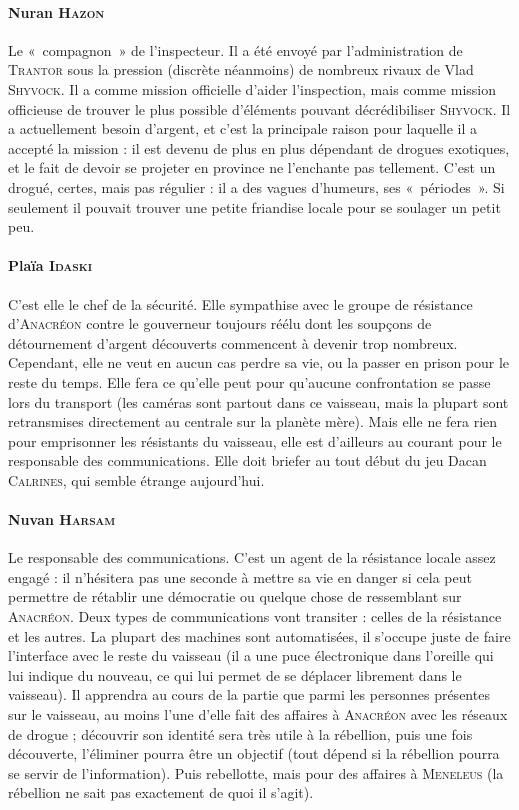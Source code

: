 \documentclass{article}
\begin{document}
{\paragraph{Nuran \textsc{Hazon}}
{
Le «~compagnon~» de l’inspecteur.
Il a été envoyé par l’administration de \textsc{Trantor} sous la pression (discrète néanmoins) de nombreux rivaux de Vlad \textsc{Shyvock}.
Il a comme mission officielle d’aider l’inspection, mais comme mission officieuse de trouver le plus possible d’éléments pouvant décrédibiliser \textsc{Shyvock}.
Il a actuellement besoin d’argent, et c’est la principale raison pour laquelle il a accepté la mission : il est devenu de plus en plus dépendant de drogues exotiques, et le fait de devoir se projeter en province ne l’enchante pas tellement. C’est un drogué, certes, mais pas régulier : il a des vagues d’humeurs, ses «~périodes~».
Si seulement il pouvait trouver une petite friandise locale pour se soulager un petit peu.
}

\paragraph{Plaïa \textsc{Idaski}}
{
C’est elle le chef de la sécurité.
Elle sympathise avec le groupe de résistance d’\textsc{Anacréon} contre le gouverneur toujours réélu dont les soupçons de détournement d’argent découverts commencent à devenir trop nombreux.
Cependant, elle ne veut en aucun cas perdre sa vie, ou la passer en prison pour le reste du temps.
Elle fera ce qu’elle peut pour qu’aucune confrontation se passe lors du transport (les caméras sont partout dans ce vaisseau, mais la plupart sont retransmises directement au centrale sur la planète mère).
Mais elle ne fera rien pour emprisonner les résistants du vaisseau, elle est d’ailleurs au courant pour le responsable des communications.
Elle doit briefer au tout début du jeu Dacan \textsc{Calrines}, qui semble étrange aujourd’hui.
}

\paragraph{Nuvan \textsc{Harsam}}
{
Le responsable des communications.
C’est un agent de la résistance locale assez engagé : il n’hésitera pas une seconde à mettre sa vie en danger si cela peut permettre de rétablir une démocratie ou quelque chose de ressemblant sur \textsc{Anacréon}.
Deux types de communications vont transiter : celles de la résistance et les autres.
La plupart des machines sont automatisées, il s’occupe juste de faire l’interface avec le reste du vaisseau (il a une puce électronique dans l’oreille qui lui indique du nouveau, ce qui lui permet de se déplacer librement dans le vaisseau).
Il apprendra au cours de la partie que parmi les personnes présentes sur le vaisseau, au moins l’une d’elle fait des affaires à \textsc{Anacréon} avec les réseaux de drogue ; découvrir son identité sera très utile à la rébellion, puis une fois découverte, l’éliminer pourra être un objectif (tout dépend si la rébellion pourra se servir de l’information).
Puis rebellotte, mais pour des affaires à \textsc{Meneleus} (la rébellion ne sait pas exactement de quoi il s’agit).
}

}
\end{document}
